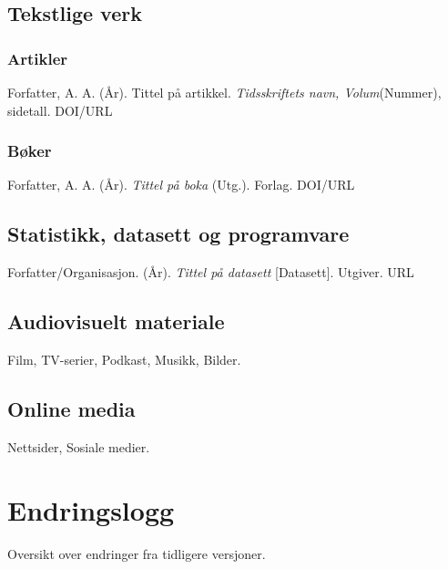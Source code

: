 \documentclass[a4paper,12pt]{report}
\begin{document}
\section{Tekstlige verk}
\subsection{Artikler}
Forfatter, A. A. (År). Tittel på artikkel. \textit{Tidsskriftets navn, Volum}(Nummer), sidetall. DOI/URL

\subsection{Bøker}
Forfatter, A. A. (År). \textit{Tittel på boka} (Utg.). Forlag. DOI/URL

\section{Statistikk, datasett og programvare}
Forfatter/Organisasjon. (År). \textit{Tittel på datasett} [Datasett]. Utgiver. URL

\section{Audiovisuelt materiale}
Film, TV-serier, Podkast, Musikk, Bilder.

\section{Online media}
Nettsider, Sosiale medier.

\chapter{Endringslogg}
Oversikt over endringer fra tidligere versjoner.
\end{document}

